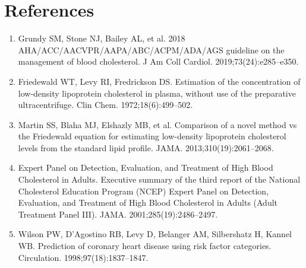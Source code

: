 \section*{References}
\begin{enumerate}
  \item Grundy SM, Stone NJ, Bailey AL, et al. 2018 AHA/ACC/AACVPR/AAPA/ABC/ACPM/ADA/AGS guideline on the management of blood cholesterol. J Am Coll Cardiol. 2019;73(24):e285--e350.
  \item Friedewald WT, Levy RI, Fredrickson DS. Estimation of the concentration of low-density lipoprotein cholesterol in plasma, without use of the preparative ultracentrifuge. Clin Chem. 1972;18(6):499--502.
  \item Martin SS, Blaha MJ, Elshazly MB, et al. Comparison of a novel method vs the Friedewald equation for estimating low-density lipoprotein cholesterol levels from the standard lipid profile. JAMA. 2013;310(19):2061--2068.
  \item Expert Panel on Detection, Evaluation, and Treatment of High Blood Cholesterol in Adults. Executive summary of the third report of the National Cholesterol Education Program (NCEP) Expert Panel on Detection, Evaluation, and Treatment of High Blood Cholesterol in Adults (Adult Treatment Panel III). JAMA. 2001;285(19):2486--2497.
  \item Wilson PW, D'Agostino RB, Levy D, Belanger AM, Silbershatz H, Kannel WB. Prediction of coronary heart disease using risk factor categories. Circulation. 1998;97(18):1837--1847.
\end{enumerate}
\clearpage
